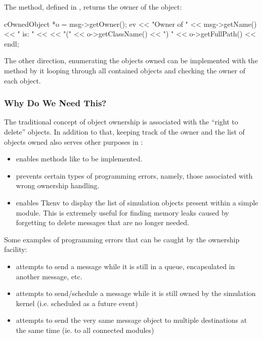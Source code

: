 The  method, defined in , returns the
owner of the object:

\begin{cpp}
cOwnedObject *o = msg->getOwner();
ev << "Owner of " << msg->getName() << " is: " <<
   << "(" << o->getClassName() << ") " << o->getFullPath() << endl;
\end{cpp}

The other direction, enumerating the objects owned can be implemented with
the  method by it looping through all
contained objects and checking the owner of each object.

\subsubsection{Why Do We Need This?}

The traditional concept of object ownership is associated with
the ``right to delete'' objects. In addition to that,
keeping track of the owner and the list of objects owned also
serves other purposes in {\opp}:

\begin{itemize}
    \item{enables methods like  to be implemented.}

    \item{prevents certain types of programming errors, namely,
    those associated with wrong ownership handling.}

    \item{enables Tkenv to display the list of simulation objects
    present within a simple module. This is extremely useful for finding
    memory leaks caused by forgetting to delete messages that are
    no longer needed.}
\end{itemize}

Some examples of programming errors that can be caught
by the ownership facility:

\begin{itemize}
    \item{attempts to send a message while it is still in a queue,
    encapsulated in another message, etc.}

    \item{attempts to send/schedule a message while it is still owned
    by the simulation kernel (i.e. scheduled as a future event)}

    \item{attempts to send the very same message object to multiple
    destinations at the same time (ie. to all connected modules)}
\end{itemize}

